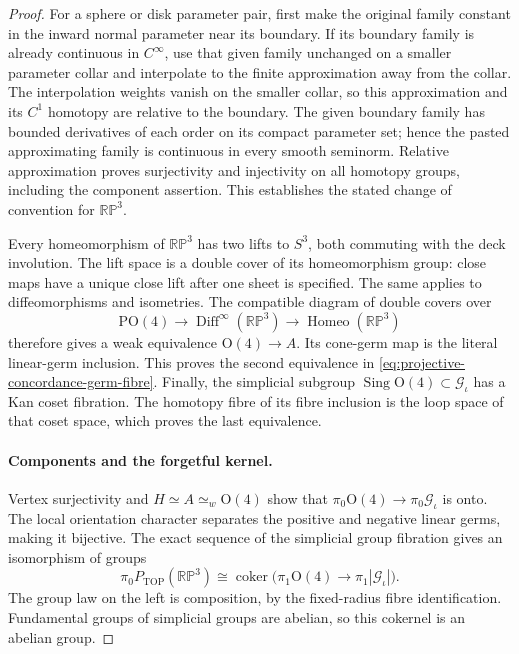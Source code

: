 \begin{proof}
For a sphere or disk parameter pair, first make the
original family constant in the inward normal
parameter near its boundary.  If its boundary family
is already continuous in $C^{\infty}$, use that given
family unchanged on a smaller parameter collar and
interpolate to the finite approximation away from
the collar.  The interpolation weights vanish on
the smaller collar, so this approximation and its
$C^1$ homotopy are relative to the boundary.  The
given boundary family has bounded derivatives of
each order on its compact parameter set; hence the
pasted approximating family is continuous in every
smooth seminorm.  Relative approximation proves
surjectivity and injectivity on all homotopy groups,
including the component assertion.  This establishes
the stated change of convention for $\mathbb{RP}^3$.

Every homeomorphism of $\mathbb{RP}^3$ has two lifts
to $S^3$, both commuting with the deck involution.
The lift space is a double cover of its homeomorphism
group: close maps have a unique close lift after
one sheet is specified.  The same applies to
diffeomorphisms and isometries.  The compatible
diagram of double covers over
\[
 \mathrm{PO}(4)\longrightarrow
 \operatorname{Diff}^{\infty}(\mathbb{RP}^3)
 \longrightarrow\operatorname{Homeo}(\mathbb{RP}^3)
\]
therefore gives a weak equivalence $\mathrm O(4)\to A$.
Its cone-germ map is the literal linear-germ inclusion.
This proves the second equivalence in
\eqref{eq:projective-concordance-germ-fibre}.
Finally, the simplicial subgroup
$\operatorname{Sing}\mathrm O(4)\subset\mathcal G_{\iota}$
has a Kan coset fibration.  The homotopy fibre of its
fibre inclusion is the loop space of that coset space,
which proves the last equivalence.

\paragraph{Components and the forgetful kernel.}
Vertex surjectivity and $H\simeq A\simeq_w\mathrm O(4)$
show that $\pi_0\mathrm O(4)\to\pi_0\mathcal G_{\iota}$
is onto.  The local orientation character separates
the positive and negative linear germs, making it
bijective.  The exact sequence of the simplicial
group fibration gives an isomorphism of groups
\[
 \pi_0P_{\mathrm{TOP}}(\mathbb{RP}^3)
 \cong\operatorname{coker}\bigl(
     \pi_1\mathrm O(4)\longrightarrow
     \pi_1|\mathcal G_{\iota}|\bigr).
\]
The group law on the left is composition, by the
fixed-radius fibre identification.  Fundamental
groups of simplicial groups are abelian, so this
cokernel is an abelian group.


\end{proof}
